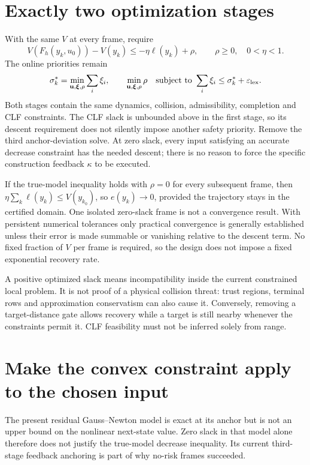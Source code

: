 \documentclass[11pt]{article}
\begin{document}
\section{Exactly two optimization stages}
With the same $V$ at every frame, require
\[
 V(F_h(y_k,u_0))-V(y_k)\le-\eta\ell(y_k)+\rho,\qquad
 \rho\ge0,\quad0<\eta<1.
\]
The online priorities remain
\[
 \sigma_k^*=\min_{\mathbf u,\boldsymbol\xi,\rho}\sum_i\xi_i,
 \qquad
 \min_{\mathbf u,\boldsymbol\xi,\rho}\rho
 \quad\text{subject to }\sum_i\xi_i\le\sigma_k^*+\varepsilon_{\rm lex}.
\]
Both stages contain the same dynamics, collision, admissibility, completion
and CLF constraints. The CLF slack is unbounded above in the first stage, so
its descent requirement does not silently impose another safety priority.
Remove the third anchor-deviation solve. At zero slack, every input satisfying
an accurate decrease constraint has the needed descent; there is no reason to
force the specific construction feedback $\kappa$ to be executed.

If the true-model inequality holds with $\rho=0$ for every subsequent frame,
then $\eta\sum_k\ell(y_k)\le V(y_{k_0})$, so $e(y_k)\to0$, provided the
trajectory stays in the certified domain. One isolated zero-slack frame is
not a convergence result. With persistent numerical tolerances only practical
convergence is generally established unless their error is made summable or
vanishing relative to the descent term. No fixed fraction of $V$ per frame is
required, so the design does not impose a fixed exponential recovery rate.

A positive optimized slack means incompatibility inside the current constrained
local problem. It is not proof of a physical collision threat: trust regions,
terminal rows and approximation conservatism can also cause it. Conversely,
removing a target-distance gate allows recovery while a target is still nearby
whenever the constraints permit it. CLF feasibility must not be inferred solely
from range.

\section{Make the convex constraint apply to the chosen input}
The present residual Gauss--Newton model is exact at its anchor but is not an
upper bound on the nonlinear next-state value. Zero slack in that model alone
therefore does not justify the true-model decrease inequality. Its current
third-stage feedback anchoring is part of why no-risk frames succeeded.
\end{document}
